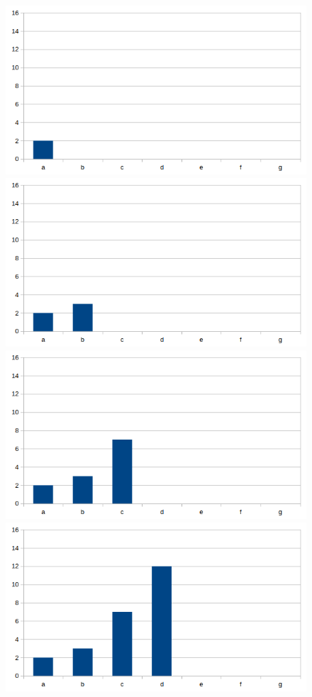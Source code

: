 \documentclass{beamer}
\begin{document}
\begin{frame}

	\begin{figure}
	 {\includegraphics[scale=0.70]{a1}}
	\only<2> {\includegraphics[scale=0.70]{a2}}
	\only<3> {\includegraphics[scale=0.70]{a3}}
	\only<4> {\includegraphics[scale=0.70]{a4}}

\end{figure}
\end{frame}
\end{document}
